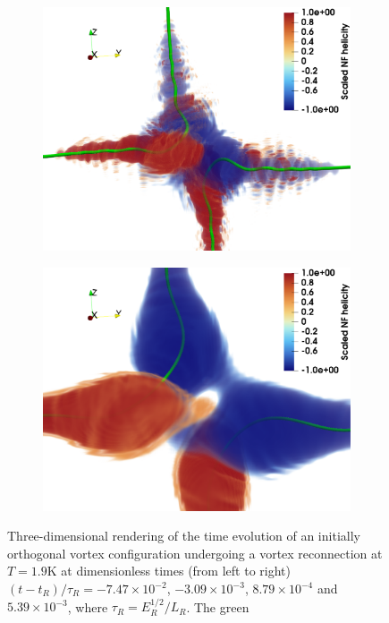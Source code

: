 \documentclass[%
 reprint,
 amsmath,amssymb,
 aps,
 prl,
]{revtex4-2}
\begin{document}
\begin{figure}
\begin{subfigure}[b]{0.24\textwidth}
		\includegraphics*[width=\textwidth]{snaps-hel-3.pdf}
	\end{subfigure}
    \begin{subfigure}[b]{0.24\textwidth}
		\centering
		\includegraphics*[width=\textwidth]{snaps-hel-4.pdf}
	\end{subfigure} \hfill
	\caption{
Three-dimensional rendering of the time evolution of
an initially orthogonal vortex configuration 
undergoing a vortex reconnection at $T = 1.9$K at dimensionless
times (from left to right)
$(t-t_R)/\tau_R=-7.47\times10^{-2}$, $-3.09\times10^{-3}$, $8.79\times10^{-4}$ and $5.39\times10^{-3}$, where $\tau_R = E^{1/2}_R/ L_R$. The green
}
\end{figure}
\end{document}
